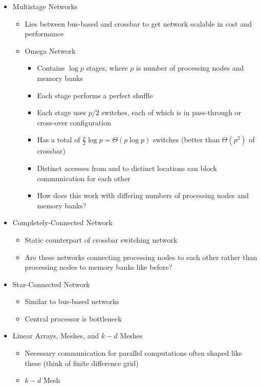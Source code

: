 \documentclass[a4paper]{article}
\begin{document}
\begin{itemize}
\begin{itemize}
      \item Multistage Networks
        \begin{itemize}
          \item Lies between bus-based and crossbar to get network scalable in cost and performance
          \item Omega Network
            \begin{itemize}
              \item Contains $\log p$ stages, where $p$ is number of processing nodes and memory banks
              \item Each stage performs a perfect shuffle
              \item Each stage uses $p/2$ switches, each of which is in pass-through or cross-over configuration
              \item Has a total of $\frac{p}{2} \log p = \Theta(p \log p)$ switches (better than $\Theta(p^2)$ of crossbar)
              \item Distinct accesses from and to distinct locations can block communication for each other
              \item \color{red} How does this work with differing numbers of processing nodes and memory banks?
            \end{itemize}
        \end{itemize}
      \item Completely-Connected Network
        \begin{itemize}
          \item Static counterpart of crossbar switching network
          \item \color{red} Are these networks connecting processing nodes to each other rather than processing nodes to memory banks like before?
        \end{itemize}
      \item Star-Connected Network
        \begin{itemize}
          \item Similar to bus-based networks
          \item Central processor is bottleneck
        \end{itemize}
      \item Linear Arrays, Meshes, and $k-d$ Meshes
        \begin{itemize}
          \item Necessary communication for parallel computations often shaped like these (think of finite difference grid)
          \item $k-d$ Mesh

\end{itemize}
\end{itemize}
\end{itemize}
\end{document}
